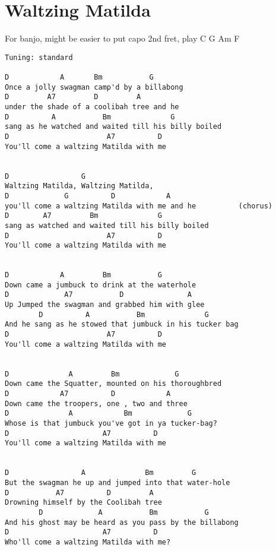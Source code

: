 \documentclass[leqno]{memoir}
\begin{document}
\chapter{Waltzing Matilda}
For banjo, might be easier to put capo 2nd fret, play
C G Am F
\begin{verbatim}
Tuning: standard

D            A       Bm           G
Once a jolly swagman camp'd by a billabong
D         A7         D         A
under the shade of a coolibah tree and he
D          A           Bm              G
sang as he watched and waited till his billy boiled
D                       A7          D
You'll come a waltzing Matilda with me


D                 G          
Waltzing Matilda, Waltzing Matilda,
D             G          D            A
you'll come a waltzing Matilda with me and he          (chorus)
D        A7         Bm              G
sang as watched and waited till his billy boiled
D                       A7          D
You'll come a waltzing Matilda with me


D            A         Bm           G
Down came a jumbuck to drink at the waterhole
D             A7           D               A
Up Jumped the swagman and grabbed him with glee
        D          A           Bm              G
And he sang as he stowed that jumbuck in his tucker bag
D                       A7          D
You'll come a waltzing Matilda with me


D              A         Bm             G
Down came the Squatter, mounted on his thoroughbred
D            A7          D            A
Down came the troopers, one , two and three
D              A            Bm             G
Whose is that jumbuck you've got in ya tucker-bag?
D                      A7          D
You'll come a waltzing Matilda with me


D                 A              Bm         G
But the swagman he up and jumped into that water-hole
D           A7          D         A
Drowning himself by the Coolibah tree
        D             A           Bm           G
And his ghost may be heard as you pass by the billabong
D                      A7          D
Who'll come a waltzing Matilda with me?

\end{verbatim}
\newpage
\end{document}
